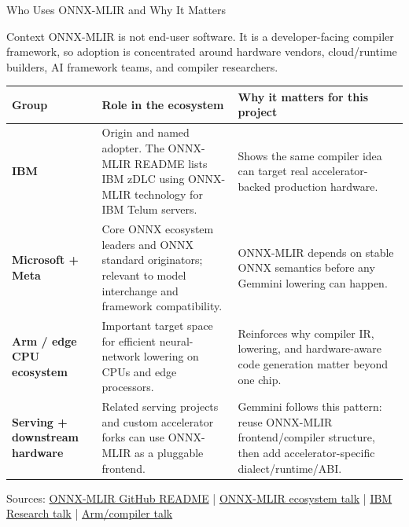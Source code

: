 \documentclass[aspectratio=169,10pt]{beamer}
\newcommand{\edgeword}[1]{\textcolor{red!75!black}{\textbf{#1}}}
\begin{document}
\begin{frame}{Who Uses ONNX-MLIR and Why It Matters}
  \scriptsize
  \begin{block}{Context}
    ONNX-MLIR is not end-user software. It is a developer-facing compiler framework, so adoption is concentrated around hardware vendors, cloud/runtime builders, AI framework teams, and compiler researchers.
  \end{block}

  \vspace{0.25em}
  \begin{tabularx}{\textwidth}{@{}lXX@{}}
    \toprule
    Group & Role in the ecosystem & Why it matters for this project \\
    \midrule
    \edgeword{IBM} &
      Origin and named adopter. The ONNX-MLIR README lists IBM zDLC using ONNX-MLIR technology for IBM Telum servers. &
      Shows the same compiler idea can target real accelerator-backed production hardware. \\
    \edgeword{Microsoft + Meta} &
      Core ONNX ecosystem leaders and ONNX standard originators; relevant to model interchange and framework compatibility. &
      ONNX-MLIR depends on stable ONNX semantics before any Gemmini lowering can happen. \\
    \edgeword{Arm / edge CPU ecosystem} &
      Important target space for efficient neural-network lowering on CPUs and edge processors. &
      Reinforces why compiler IR, lowering, and hardware-aware code generation matter beyond one chip. \\
    \edgeword{Serving + downstream hardware} &
      Related serving projects and custom accelerator forks can use ONNX-MLIR as a pluggable frontend. &
      Gemmini follows this pattern: reuse ONNX-MLIR frontend/compiler structure, then add accelerator-specific dialect/runtime/ABI. \\
    \bottomrule
  \end{tabularx}

  \vspace{0.35em}
  {\tiny Sources:
  \href{https://github.com/onnx/onnx-mlir}{ONNX-MLIR GitHub README}
  \quad|\quad
  \href{https://www.youtube.com/watch?v=V70XXsPVrzg}{ONNX-MLIR ecosystem talk}
  \quad|\quad
  \href{https://www.youtube.com/watch?v=cXHTu2wI5Ps}{IBM Research talk}
  \quad|\quad
  \href{https://www.youtube.com/watch?v=kJ9JoOoOj1A}{Arm/compiler talk}}
\end{frame}
\end{document}
